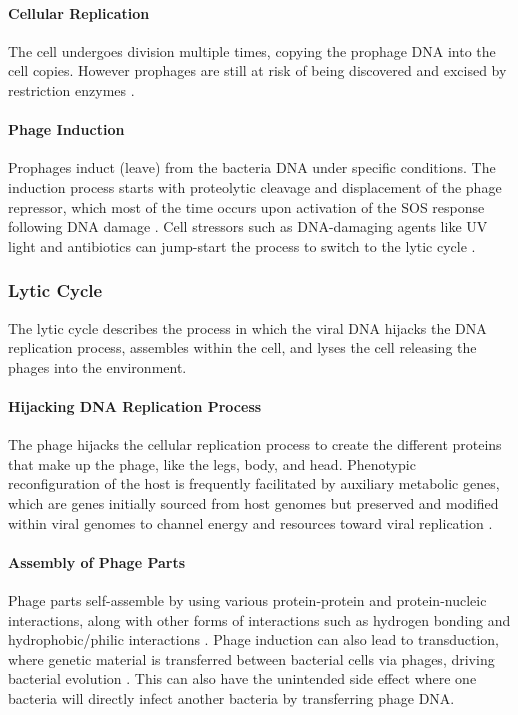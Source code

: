 \paragraph{Cellular Replication}
The cell undergoes division multiple times, copying the prophage DNA into the cell copies. 
However prophages are still at risk of being discovered and excised by restriction enzymes \cite{sharpMolecularEvolutionBacteriophages1986}. 
\paragraph{Phage Induction}
Prophages induct (leave) from the bacteria DNA under specific conditions. 
The induction process starts with proteolytic cleavage and displacement of the phage repressor, which most of the time occurs upon activation of the SOS response following DNA damage \cite{waldorPhageRegulatoryCircuits2005}. 
Cell stressors such as DNA-damaging agents like UV light and antibiotics can jump-start the process to switch to the lytic cycle \cite{stoneUnderstandingExploitingPhage2019, fortierImportanceProphagesEvolution2013}. 

\subsubsection{Lytic Cycle}
The lytic cycle describes the process in which the viral DNA hijacks the DNA replication process, assembles within the cell, and lyses the cell releasing the phages into the environment. 
\paragraph{Hijacking DNA Replication Process}
The phage hijacks the cellular replication process to create the different proteins that make up the phage, like the legs, body, and head. 
Phenotypic reconfiguration of the host is frequently facilitated by auxiliary metabolic genes, which are genes initially sourced from host genomes but preserved and modified within viral genomes to channel energy and resources toward viral replication \cite{warwick-dugdaleHosthijackingPlanktonicPiracy2019}. 
\paragraph{Assembly of Phage Parts}
Phage parts self-assemble by using various protein-protein and protein-nucleic interactions, along with other forms of interactions such as hydrogen bonding and hydrophobic/philic interactions \cite{aksyukBacteriophageAssembly2011}. 
Phage induction can also lead to transduction, where genetic material is transferred between bacterial cells via phages, driving bacterial evolution \cite{fortierImportanceProphagesEvolution2013}. 
This can also have the unintended side effect where one bacteria will directly infect another bacteria by transferring phage DNA. 
